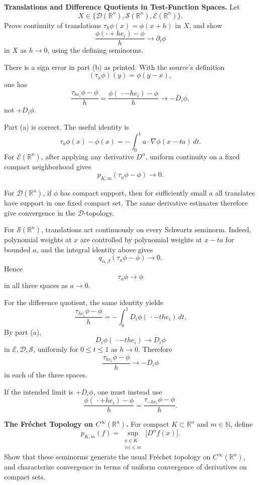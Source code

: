 \begin{problem}[CP-II-0413]
\label{prob:cp-ii-0413}
\textbf{Translations and Difference Quotients in Test-Function Spaces.}
Let
\[
X\in\{\mathcal D(\mathbb R^n),\mathcal S(\mathbb R^n),\mathcal E(\mathbb R^n)\}.
\]
Prove continuity of translations \(\tau_h\phi(x)=\phi(x+h)\) in \(X\), and show
\[
\frac{\phi(\cdot+he_i)-\phi}{h}\to\partial_i\phi
\]
in \(X\) as \(h\to0\), using the defining seminorms.
\end{problem}

\begin{solution}
There is a sign error in part (b) as printed. With the source's definition
\[
(\tau_x\phi)(y)=\phi(y-x),
\]
one has
\[
\frac{\tau_{he_i}\phi-\phi}{h}
=
\frac{\phi(\,\cdot-he_i)-\phi}{h}
\longrightarrow
-D_i\phi,
\]
not \(+D_i\phi\).

Part (a) is correct. The useful identity is
\[
\tau_a\phi(x)-\phi(x)
=
-\int_0^1
a\cdot\nabla\phi(x-ta)\,dt.
\]
For \(\mathcal E(\mathbb R^n)\), after applying any derivative \(D^\alpha\), uniform
continuity on a fixed compact neighborhood gives
\[
p_{K,m}(\tau_a\phi-\phi)\to0.
\]

For \(\mathcal D(\mathbb R^n)\), if \(\phi\) has compact support, then for sufficiently small
\(a\) all translates have support in one fixed compact set. The same derivative estimates
therefore give convergence in the \(\mathcal D\)-topology.

For \(\mathcal S(\mathbb R^n)\), translations act continuously on every Schwartz seminorm.
Indeed, polynomial weights at \(x\) are controlled by polynomial weights at \(x-ta\) for
bounded \(a\), and the integral identity above gives
\[
q_{\alpha,\beta}(\tau_a\phi-\phi)\longrightarrow0.
\]
Hence
\[
\boxed{\tau_a\phi\to\phi}
\]
in all three spaces as \(a\to0\).

For the difference quotient, the same identity yields
\[
\frac{\tau_{he_i}\phi-\phi}{h}
=
-\int_0^1
D_i\phi(\,\cdot-th e_i)\,dt.
\]
By part (a),
\[
D_i\phi(\,\cdot-th e_i)\to D_i\phi
\]
in \(\mathcal E,\mathcal D,\mathcal S\), uniformly for \(0\le t\le1\) as \(h\to0\).
Therefore
\[
\boxed{
\frac{\tau_{he_i}\phi-\phi}{h}
\longrightarrow
-D_i\phi
}
\]
in each of the three spaces.

If the intended limit is \(+D_i\phi\), one must instead use
\[
\frac{\phi(\,\cdot+he_i)-\phi}{h}
=
\frac{\tau_{-he_i}\phi-\phi}{h}.
\]
\end{solution}


\begin{problem}[CP-II-0415]
\label{prob:cp-ii-0415}
\textbf{The Fréchet Topology on \(C^\infty(\mathbb R^n)\).}
For compact \(K\subset\mathbb R^n\) and \(m\in\mathbb N\), define
\[
p_{K,m}(f)=\sup_{\substack{x\in K\\|\alpha|\le m}}|D^\alpha f(x)|.
\]
Show that these seminorms generate the usual Fréchet topology on \(C^\infty(\mathbb R^n)\), and characterize convergence in terms of uniform convergence of derivatives on compact sets.
\end{problem}

